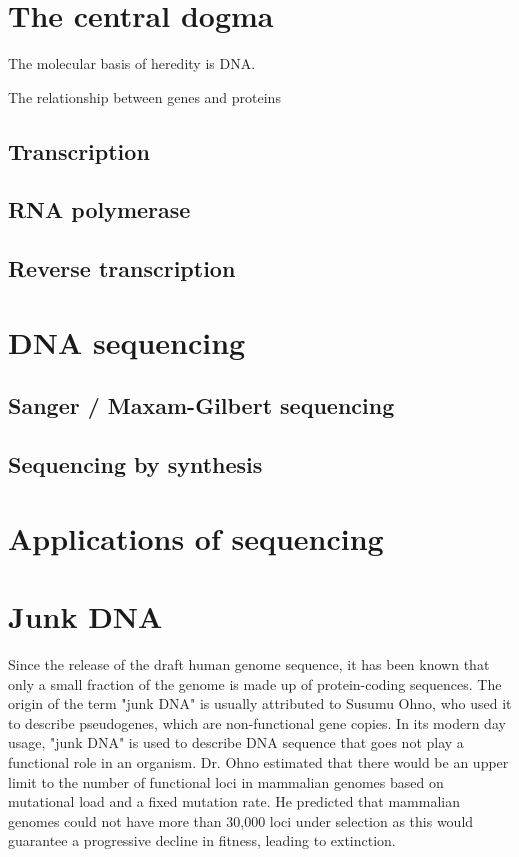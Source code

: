 \section{The central dogma}

The molecular basis of heredity is DNA.

The relationship between genes and proteins 

\subsection{Transcription}

\subsection{RNA polymerase}

\subsection{Reverse transcription}

\section{DNA sequencing}

\subsection{Sanger / Maxam-Gilbert sequencing}

\subsection{Sequencing by synthesis}

\section{Applications of sequencing}

\section{Junk DNA}

Since the release of the draft human genome sequence\cite{lander2001initial}, it has been known that only a small fraction of the genome is made up of protein-coding sequences. The origin of the term "junk DNA" is usually attributed to Susumu Ohno, who used it to describe pseudogenes, which are non-functional gene copies. In its modern day usage, "junk DNA" is used to describe DNA sequence that goes not play a functional role in an organism. Dr. Ohno estimated that there would be an upper limit to the number of functional loci in mammalian genomes based on mutational load and a fixed mutation rate. He predicted that mammalian genomes could not have more than 30,000 loci under selection as this would guarantee a progressive decline in fitness, leading to extinction.

